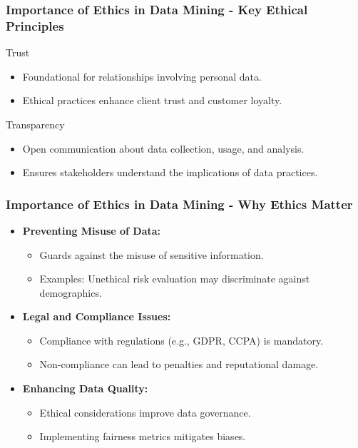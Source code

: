 \documentclass{beamer}
\begin{document}
\begin{frame}[fragile]
    \frametitle{Importance of Ethics in Data Mining - Key Ethical Principles}
    \begin{block}{Trust}
        \begin{itemize}
            \item Foundational for relationships involving personal data.
            \item Ethical practices enhance client trust and customer loyalty.
        \end{itemize}
    \end{block}
    
    \begin{block}{Transparency}
        \begin{itemize}
            \item Open communication about data collection, usage, and analysis.
            \item Ensures stakeholders understand the implications of data practices.
        \end{itemize}
    \end{block}
\end{frame}

\begin{frame}[fragile]
    \frametitle{Importance of Ethics in Data Mining - Why Ethics Matter}
    \begin{itemize}
        \item \textbf{Preventing Misuse of Data:}
            \begin{itemize}
                \item Guards against the misuse of sensitive information.
                \item Examples: Unethical risk evaluation may discriminate against demographics.
            \end{itemize}
        
        \item \textbf{Legal and Compliance Issues:}
            \begin{itemize}
                \item Compliance with regulations (e.g., GDPR, CCPA) is mandatory.
                \item Non-compliance can lead to penalties and reputational damage.
            \end{itemize}

        \item \textbf{Enhancing Data Quality:}
            \begin{itemize}
                \item Ethical considerations improve data governance.
                \item Implementing fairness metrics mitigates biases.
            \end{itemize}
    \end{itemize}
\end{frame}
\end{document}
